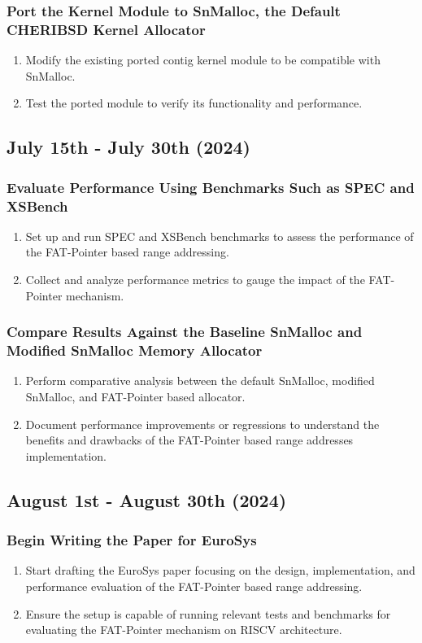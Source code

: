     \subsubsection{Port the Kernel Module to SnMalloc, the Default CHERIBSD Kernel Allocator}
    \begin{enumerate}
        \item Modify the existing ported contig kernel module to be compatible with SnMalloc.
        \item Test the ported module to verify its functionality and performance.
    \end{enumerate}

\subsection{July 15th - July 30th (2024)}
\subsubsection{Evaluate Performance Using Benchmarks Such as SPEC and XSBench}
\begin{enumerate}
    \item Set up and run SPEC and XSBench benchmarks to assess the performance of the FAT-Pointer based range addressing.
    \item Collect and analyze performance metrics to gauge the impact of the FAT-Pointer mechanism.
\end{enumerate}
\subsubsection{Compare Results Against the Baseline SnMalloc and Modified SnMalloc Memory Allocator}
\begin{enumerate}
    \item Perform comparative analysis between the default SnMalloc, modified SnMalloc, and FAT-Pointer based allocator.
    \item Document performance improvements or regressions to understand the benefits and drawbacks of the FAT-Pointer based range addresses implementation.
\end{enumerate}

\subsection{August 1st - August 30th (2024)}
\subsubsection{Begin Writing the Paper for EuroSys}
\begin{enumerate}
    \item Start drafting the EuroSys paper focusing on the design, implementation, and performance evaluation of the FAT-Pointer based range addressing.
    \item Ensure the setup is capable of running relevant tests and benchmarks for evaluating the FAT-Pointer mechanism on RISCV architecture.
\end{enumerate}

